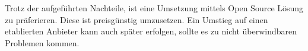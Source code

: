 Trotz der aufgeführten Nachteile, ist eine Umsetzung mittels Open Source Lösung zu präferieren. Diese ist preisgünstig umzusetzen. Ein Umstieg auf einen etablierten Anbieter kann auch später erfolgen, sollte es zu nicht überwindbaren Problemen kommen.





